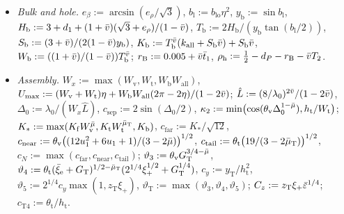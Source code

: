 \begin{TDdefinition}[Constants]
{\begin{itemize}
$y_{\mathrm c}:=2(1+e_{\mathrm t})h_{\mathrm T}/(1-\HTvb)$, $y_{\mathrm T}:=C_{\mathrm{hi}}^{1/(1+\HTvb)}\max(1,y_{\mathrm c})^{\HTvb}$,
$T_{\mathrm t}:=\bigl(\max(1,y_{\mathrm c}/C_{\mathrm{lo}})\cdot2/b_{\mathrm{lo}}\bigr)^{\HTvb}$;
$Y_2:=T_{\mathrm t}\ell_{\max}/(2\TDa_{\min})$, $\bar Y_2:=Y_2\eta^{1-\HTmTb}$,
$\theta_{\mathrm t}:=Y_2+\HTvb y_{\mathrm T}/h_{\mathrm t}$, $z_{\mathrm T}:=(h_{\mathrm T}+\HTvb y_{\mathrm T}\eta^{1-\HTmTb})/(1-\HTvb)$,
$\rho_{\mathrm T}:=z_{\mathrm T}\bigl(1+(y_{\mathrm T}\eta^{1-\HTmTb}/h_{\mathrm t})^2\bigr)^{1/2}$;
$W_{\mathrm t}:=\TDa_{\max}\bigl[(1+\HTvb+\HTvb\bar Y_2)^2+((1+\HTvb)\bar Y_2+\HTvb)^2\bigr]^{1/2}/(1-\HTvb^2)$;
$S_3:=(y_{\mathrm T}/h_{\mathrm t}+\theta_{\mathrm t})(\rho_{\mathrm T}\TDa_{\max}L_C+1+\HTvb)/((1-\HTvb^2)h_{\mathrm t})$,
$K_{\mathrm t}:=T_{\mathrm t}(1+\kappa_{\mathrm w}+S_1\HTvb)+S_3\HTvb$; $\xi_2:=1/(3(1-\HTvb)\STA_{\min})$;
$h_{\mathrm a}:=1-\STA_{\max}/2-\TDr_{\max}b_{\mathrm{hi}}^2\HTeb^3/32$, $Q_{\mathrm a}:=(1+\HTvb)\TDr_{\max}/h_{\mathrm a}$,
$\tau_{\mathrm a}:=\beta_2Q_{\mathrm a}^{1+\HTmb}\HTeb^{1-\HTmb}/4$.
\item \emph{Bulk and hole.} $e_\beta:=\arcsin(e_\rho/\sqrt3)$, $b_{\mathrm l}:=b_{\mathrm{lo}}\eta^2$, $y_{\mathrm b}:=\sin b_{\mathrm l}$,
$H_{\mathrm b}:=3+d_1+(1+\bar v)(\sqrt3+e_\rho)/(1-\bar v)$, $T_{\mathrm b}:=2H_{\mathrm b}/(y_{\mathrm b}\tan(b_{\mathrm l}/2))$,
$S_{\mathrm b}:=(3+\bar v)/(2(1-\bar v)y_{\mathrm b})$, $K_{\mathrm b}:=T_{\mathrm b}^{\bar v}(k_{\mathrm{all}}+S_{\mathrm b}\bar v)+S_{\mathrm b}\bar v$,
$W_{\mathrm b}:=((1+\bar v)/(1-\bar v))T_{\mathrm b}^{\bar v}$; $r_{\mathrm B}:=0.005+\bar v\bar t_1$,
$\rho_{\mathrm h}:=\frac12-d_P-r_{\mathrm B}-\bar v T_2$.
\item \emph{Assembly.} $W_x:=\max(W_{\mathrm v},W_{\mathrm t},W_{\mathrm b}W_{\mathrm{all}})$,
$U_{\max}:=(W_{\mathrm v}+W_{\mathrm t})\eta+W_{\mathrm b}W_{\mathrm{all}}(2\pi-2\eta)/(1-2\bar v)$;
$\hat L:=(8/\lambda_0)^{2\bar v}/(1-2\bar v)$, $\Delta_0:=\lambda_0/(W_x\hat L)$, $c_{\mathrm{sep}}:=2\sin(\Delta_0/2)$,
$\kappa_2:=\min\bigl(\cos(\theta_{\mathrm v}\Delta_0^{1-\bar\mu}),h_{\mathrm t}/W_{\mathrm t}\bigr)$;
$K_*:=\max(K_{\mathrm f}W_{\mathrm v}^{\bar\mu},K_{\mathrm t}W_{\mathrm t}^{\bar\mu_{\mathrm T}},K_{\mathrm b})$, $c_{\mathrm{far}}:=K_*/\sqrt{12}$,
$c_{\mathrm{near}}:=\theta_{\mathrm v}\bigl((12u_1^2+6u_1+1)/(3-2\bar\mu)\bigr)^{1/2}$,
$c_{\mathrm{tail}}:=\theta_{\mathrm t}\bigl(19/(3-2\bar\mu_{\mathrm T})\bigr)^{1/2}$, $c_N:=\max(c_{\mathrm{far}},c_{\mathrm{near}},c_{\mathrm{tail}})$;
$\vartheta_3:=\theta_{\mathrm v}G_{\mathrm T}^{3/4-\bar\mu}$,
$\vartheta_4:=\theta_{\mathrm t}(\bar\xi_{\mathrm e}+G_{\mathrm T})^{1/2-\bar\mu_{\mathrm T}}(2^{1/4}\xi_+^{1/2}+G_{\mathrm T}^{1/4})$,
$c_y:=y_{\mathrm T}/h_{\mathrm t}^2$, $\vartheta_5:=2^{1/4}c_y\max(1,z_{\mathrm T}\xi_+)$,
$\vartheta_{\mathrm T}:=\max(\vartheta_3,\vartheta_4,\vartheta_5)$; $C_z:=z_{\mathrm T}\xi_+\bar\varepsilon^{1/4}$;
$c_{\mathrm T4}:=\theta_{\mathrm t}/h_{\mathrm t}$.
\end{itemize}}
\end{TDdefinition}

